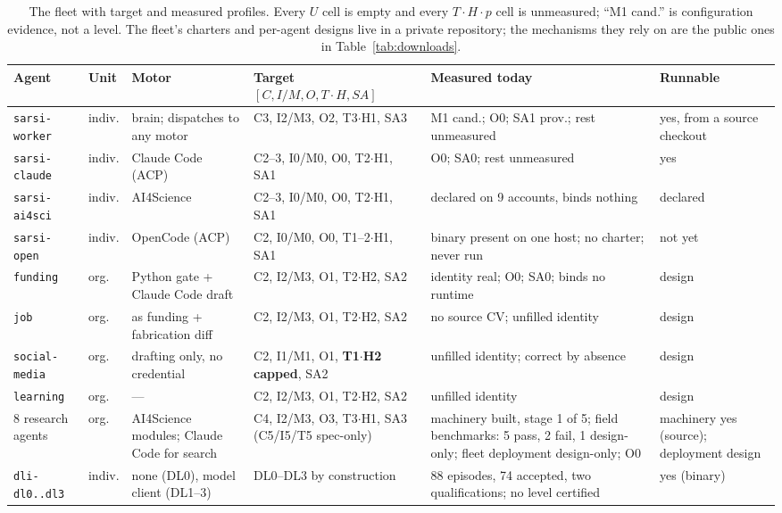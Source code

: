 \begin{table}[H]
\centering\footnotesize
\begin{tabularx}{\textwidth}{@{}p{2.1cm}p{0.9cm}YYYp{1.7cm}@{}}
\toprule
Agent & Unit & Motor & Target $[C, I/M, O, T{\cdot}H, SA]$ & Measured today & Runnable \\
\midrule
\texttt{sarsi-worker} & indiv. & brain; dispatches to any motor & C3, I2/M3, O2, T3$\cdot$H1, SA3 & M1 cand.; O0; SA1 prov.; rest unmeasured & yes, from a source checkout \\
\texttt{sarsi-claude} & indiv. & Claude Code (ACP) & C2--3, I0/M0, O0, T2$\cdot$H1, SA1 & O0; SA0; rest unmeasured & yes \\
\texttt{sarsi-ai4sci} & indiv. & AI4Science & C2--3, I0/M0, O0, T2$\cdot$H1, SA1 & declared on 9 accounts, binds nothing & declared \\
\texttt{sarsi-open} & indiv. & OpenCode (ACP) & C2, I0/M0, O0, T1--2$\cdot$H1, SA1 & binary present on one host; no charter; never run & not yet \\
\texttt{funding} & org. & Python gate + Claude Code draft & C2, I2/M3, O1, T2$\cdot$H2, SA2 & identity real; O0; SA0; binds no runtime & design \\
\texttt{job} & org. & as funding + fabrication diff & C2, I2/M3, O1, T2$\cdot$H2, SA2 & no source CV; unfilled identity & design \\
\texttt{social-media} & org. & drafting only, no credential & C2, I1/M1, O1, \textbf{T1$\cdot$H2 capped}, SA2 & unfilled identity; correct by absence & design \\
\texttt{learning} & org. & --- & C2, I2/M3, O1, T2$\cdot$H2, SA2 & unfilled identity & design \\
8 research agents & org. & AI4Science modules; Claude Code for search & C4, I2/M3, O3, T3$\cdot$H1, SA3 (C5/I5/T5 spec-only) & machinery built, stage 1 of 5; field benchmarks: 5 pass, 2 fail, 1 design-only; fleet deployment design-only; O0 & machinery yes (source); deployment design \\
\texttt{dli-dl0..dl3} & indiv. & none (DL0), model client (DL1--3) & DL0--DL3 by construction & 88 episodes, 74 accepted, two qualifications; no level certified & yes (binary) \\
\bottomrule
\end{tabularx}
\caption{The fleet with target and measured profiles. Every $U$ cell is empty and every $T{\cdot}H{\cdot}p$ cell is unmeasured; ``M1 cand.'' is configuration evidence, not a level. The fleet's charters and per-agent designs live in a private repository; the mechanisms they rely on are the public ones in Table~\ref{tab:downloads}.}
\label{tab:fleet}
\end{table}

